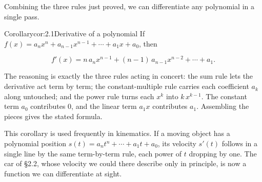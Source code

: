 \documentclass[a4paper,12pt,oneside]{memoir}
\begin{document}
Combining the three rules just proved, we can differentiate any polynomial in a single pass.

\begin{envcorollary}{Corollary}{cor:2.1}{Derivative of a polynomial}
If \(f(x) = a_{n}x^{n} + a_{n-1}x^{n-1} + \cdots + a_{1}x + a_{0}\), then

\[ f'(x) = n\,a_{n}x^{n-1} + (n-1)\,a_{n-1}x^{n-2} + \cdots + a_{1}. \]
\end{envcorollary}
The reasoning is exactly the three rules acting in concert: the sum rule lets the derivative act term by term; the constant-multiple rule carries each coefficient \(a_{k}\) along untouched; and the power rule turns each \(x^{k}\) into \(k\,x^{k-1}\). The constant term \(a_{0}\) contributes \(0\), and the linear term \(a_{1}x\) contributes \(a_{1}\). Assembling the pieces gives the stated formula.

This corollary is used frequently in kinematics. If a moving object has a polynomial position \(s(t) = a_{n}t^{n} + \cdots + a_{1}t + a_{0}\), its velocity \(s'(t)\) follows in a single line by the same term-by-term rule, each power of \(t\) dropping by one. The car of §2.2, whose velocity we could there describe only in principle, is now a function we can differentiate at sight.
\end{document}
